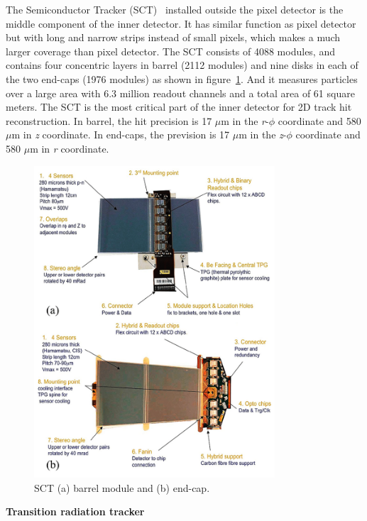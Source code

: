 The Semiconductor Tracker (SCT)~\cite{SCT_2007} installed outside the pixel detector is the middle component of the inner detector.
It has similar function as pixel detector but with long and narrow strips instead of small pixels, which makes a much larger coverage than pixel detector.
The SCT consists of 4088 modules, and contains four concentric layers in barrel (2112 modules) and nine disks in each of the two end-caps (1976 modules) as shown in figure~\ref{fig:inner_sct}.
And it measures particles over a large area with 6.3 million readout channels and a total area of 61 square meters.
The SCT is the most critical part of the inner detector for 2D track hit reconstruction.
In barrel, the hit precision is 17 $\mu$m in the \textit{r}-$\phi$ coordinate and 580 $\mu$m in \textit{z} coordinate.
In end-caps, the prevision is 17 $\mu$m in the \textit{z}-$\phi$ coordinate and 580 $\mu$m in \textit{r} coordinate.
\begin{figure}[!htb]
  \centering
  \includegraphics[width=0.8\textwidth]{figures/Detector/inner_SCT.png}
  \caption{SCT (a) barrel module and (b) end-cap\cite{Sultan:phdthesis}.}
  \label{fig:inner_sct}
\end{figure}

\textbf{Transition radiation tracker}

